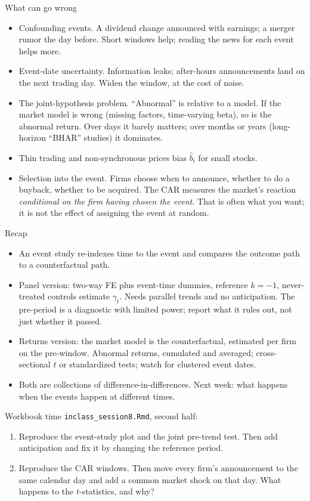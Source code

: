 \documentclass[aspectratio=169,11pt]{beamer}
\begin{document}
\begin{frame}{What can go wrong}
\begin{itemize}
	\item \alert{Confounding events.} A dividend change announced with earnings; a merger rumor the
	day before. Short windows help; reading the news for each event helps more.
	\medskip
	\item \alert{Event-date uncertainty.} Information leaks; after-hours announcements land on the
	next trading day. Widen the window, at the cost of noise.
	\medskip
	\item \alert{The joint-hypothesis problem.} ``Abnormal'' is relative to a model. If the market
	model is wrong (missing factors, time-varying beta), so is the abnormal return. Over days it barely
	matters; over months or years (long-horizon ``BHAR'' studies) it dominates.
	\medskip
	\item \alert{Thin trading and non-synchronous prices} bias $\hat b_i$ for small stocks.
	\medskip
	\item \alert{Selection into the event.} Firms choose when to announce, whether to do a buyback,
	whether to be acquired. The CAR measures the market's reaction \emph{conditional on the firm
	having chosen the event}. That is often what you want; it is not the effect of assigning the
	event at random.
\end{itemize}
\end{frame}


\begin{frame}{Recap}
\begin{itemize}
	\item An event study re-indexes time to the event and compares the outcome path to a
	counterfactual path.
	\medskip
	\item \alert{Panel version}: two-way FE plus event-time dummies, reference $k = -1$, never-treated
	controls estimate $\gamma_t$. Needs parallel trends and no anticipation. The pre-period is a
	diagnostic with limited power; report what it rules out, not just whether it passed.
	\medskip
	\item \alert{Returns version}: the market model is the counterfactual, estimated per firm on the
	pre-window. Abnormal returns, cumulated and averaged; cross-sectional $t$ or standardized tests;
	watch for clustered event dates.
	\medskip
	\item Both are collections of difference-in-differences. Next week: what happens when the
	events happen at different times.
\end{itemize}
\end{frame}


\begin{frame}{Workbook time}
\texttt{inclass\_session8.Rmd}, second half:
\begin{enumerate}
	\item Reproduce the event-study plot and the joint pre-trend test. Then add anticipation and fix
	it by changing the reference period.
	\item Reproduce the CAR windows. Then move every firm's announcement to the same calendar day and
	add a common market shock on that day. What happens to the $t$-statistics, and why?
\end{enumerate}
\end{frame}
\end{document}
